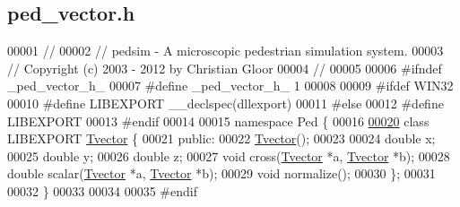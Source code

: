 \hypertarget{ped__vector_8h_source}{
\subsection{ped\_\-vector.h}
}

\begin{DoxyCode}
00001 \textcolor{comment}{//}
00002 \textcolor{comment}{// pedsim - A microscopic pedestrian simulation system. }
00003 \textcolor{comment}{// Copyright (c) 2003 - 2012 by Christian Gloor}
00004 \textcolor{comment}{//                              }
00005 
00006 \textcolor{preprocessor}{#ifndef \_ped\_vector\_h\_ }
00007 \textcolor{preprocessor}{}\textcolor{preprocessor}{#define \_ped\_vector\_h\_ 1}
00008 \textcolor{preprocessor}{}
00009 \textcolor{preprocessor}{#ifdef WIN32}
00010 \textcolor{preprocessor}{}\textcolor{preprocessor}{#define LIBEXPORT \_\_declspec(dllexport)}
00011 \textcolor{preprocessor}{}\textcolor{preprocessor}{#else}
00012 \textcolor{preprocessor}{}\textcolor{preprocessor}{#define LIBEXPORT}
00013 \textcolor{preprocessor}{}\textcolor{preprocessor}{#endif}
00014 \textcolor{preprocessor}{}
00015 \textcolor{keyword}{namespace }Ped \{
00016         
\hypertarget{ped__vector_8h_source_l00020}{}\hyperlink{classPed_1_1Tvector}{00020}         \textcolor{keyword}{class }LIBEXPORT \hyperlink{classPed_1_1Tvector}{Tvector} \{
00021         \textcolor{keyword}{public}:
00022                 \hyperlink{classPed_1_1Tvector}{Tvector}();
00023                 
00024                 \textcolor{keywordtype}{double} x;
00025                 \textcolor{keywordtype}{double} y;
00026                 \textcolor{keywordtype}{double} z;
00027                 \textcolor{keywordtype}{void} cross(\hyperlink{classPed_1_1Tvector}{Tvector} *a, \hyperlink{classPed_1_1Tvector}{Tvector} *b);
00028                 \textcolor{keywordtype}{double} scalar(\hyperlink{classPed_1_1Tvector}{Tvector} *a, \hyperlink{classPed_1_1Tvector}{Tvector} *b);
00029                 \textcolor{keywordtype}{void} normalize();
00030         \};
00031 
00032 \}
00033 
00034 
00035 \textcolor{preprocessor}{#endif}
\end{DoxyCode}
